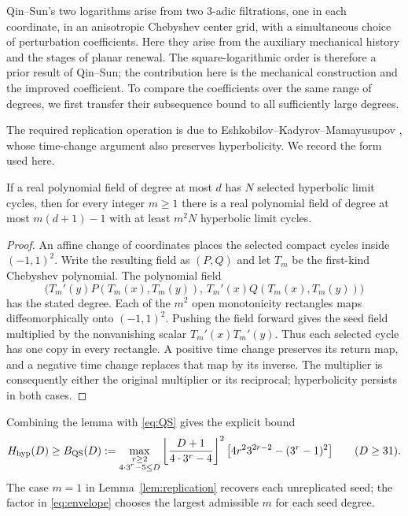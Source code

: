 Qin--Sun's two logarithms arise from two 3-adic filtrations, one in each coordinate, in an
anisotropic Chebyshev center grid, with a simultaneous choice of
perturbation coefficients. Here they arise from the auxiliary mechanical
history and the stages of planar renewal. The square-logarithmic order
is therefore a prior result of Qin--Sun; the contribution here is the
mechanical construction and the improved coefficient. To compare the
coefficients over the same range of degrees, we first transfer their
subsequence bound to all sufficiently large degrees.

The required replication operation is due to
Eshkobilov--Kadyrov--Mamayusupov
\cite[Theorem~1, Lemma~2(4) and Section~6.3]{EKM2026}, whose
time-change argument also preserves hyperbolicity. We record the form
used here.

\begin{lemma}\label{lem:replication}
If a real polynomial field of degree at most $d$ has $N$ selected
hyperbolic limit cycles, then for every integer $m\ge1$ there is a
real polynomial field of degree at most $m(d+1)-1$ with at least
$m^2N$ hyperbolic limit cycles.
\end{lemma}
\begin{proof}
An affine change of coordinates places the selected compact cycles
inside $(-1,1)^2$. Write the resulting field as $(P,Q)$ and let $T_m$
be the first-kind Chebyshev polynomial. The polynomial field
\[
 \bigl(T_m'(y)P(T_m(x),T_m(y)),\,
       T_m'(x)Q(T_m(x),T_m(y))\bigr)
\]
has the stated degree. Each of the $m^2$ open monotonicity rectangles
maps diffeomorphically onto $(-1,1)^2$. Pushing the field forward gives
the seed field multiplied by the nonvanishing scalar
$T_m'(x)T_m'(y)$. Thus each selected cycle has one copy in every
rectangle. A positive time change preserves its return map, and a
negative time change replaces that map by its inverse. The multiplier
is consequently either the original multiplier or its reciprocal;
hyperbolicity persists in both cases.
\end{proof}

Combining the lemma with \eqref{eq:QS} gives the explicit bound
\begin{equation}\label{eq:envelope}
 H_{\mathrm{hyp}}(D)\ge B_{\mathrm{QS}}(D):=
 \max_{\substack{r\ge2\\4\cdot3^r-5\le D}}
 \left\lfloor\frac{D+1}{4\cdot3^r-4}\right\rfloor^2
 \bigl[4r^2 3^{2r-2}-(3^r-1)^2\bigr]
 \qquad(D\ge31).
\end{equation}
The case $m=1$ in Lemma~\ref{lem:replication} recovers each unreplicated
seed; the factor in \eqref{eq:envelope} chooses the largest admissible $m$
for each seed degree.

